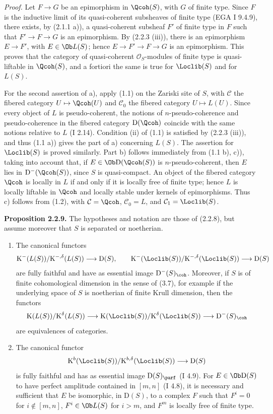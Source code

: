 \emph{Proof.} Let $F\to G$ be an epimorphism in $\Qcoh(S)$, with $G$ of finite type. Since $F$ is the inductive limit of its quasi-coherent subsheaves of finite type (EGA I 9.4.9), there exists, by (2.1.1 a)), a quasi-coherent subsheaf $F'$ of finite type in $F$ such that $F'\to F\to G$ is an epimorphism. By (2.2.3 (iii)), there is an epimorphism $E\to F'$, with $E\in\Ob L(S)$; hence $E\to F'\to F\to G$ is an epimorphism. This proves that the category of quasi-coherent $\mathcal O_S$-modules of finite type is quasi-liftable in $\Qcoh(S)$, and a fortiori the same is true for $\Loclib(S)$ and for $L(S)$.

For the second assertion of a), apply (1.1) on the Zariski site of $S$, with $\mathcal C$ the fibered category $U\mapsto\Qcoh(U)$ and $\mathcal C_0$ the fibered category $U\mapsto L(U)$. Since every object of $L$ is pseudo-coherent, the notions of $n$-pseudo-coherence and pseudo-coherence in the fibered category $\mathrm D(\Qcoh)$ coincide with the same notions relative to $L$ (I 2.14). Condition (ii) of (1.1) is satisfied by (2.2.3 (iii)), and thus (1.1 a)) gives the part of a) concerning $L(S)$. The assertion for $\Loclib(S)$ is proved similarly. Part b) follows immediately from (1.1 b), c)), taking into account that, if $E\in\Ob\mathrm D(\Qcoh(S))$ is $n$-pseudo-coherent, then $E$ lies in $\mathrm D^{-}(\Qcoh(S))$, since $S$ is quasi-compact. An object of the fibered category $\Qcoh$ is locally in $L$ if and only if it is locally free of finite type; hence $L$ is locally liftable in $\Qcoh$ and locally stable under kernels of epimorphisms. Thus c) follows from (1.2), with $\mathcal C=\Qcoh$, $\mathcal C_0=L$, and $\mathcal C_1=\Loclib(S)$.

\textbf{Proposition 2.2.9.} The hypotheses and notation are those of (2.2.8), but assume moreover that $S$ is separated or noetherian.
\begin{enumerate}[label=\alph*)]
\item The canonical functors
\[
\mathrm K^{-}(L(S))/\mathrm K^{-,\delta}(L(S))\longrightarrow \mathrm D(S),
\qquad
\mathrm K^{-}(\Loclib(S))/\mathrm K^{-,\delta}(\Loclib(S))\longrightarrow \mathrm D(S)
\]
are fully faithful and have as essential image $\mathrm D^{-}(S)_{\coh}$. Moreover, if $S$ is of finite cohomological dimension in the sense of (3.7), for example if the underlying space of $S$ is noetherian of finite Krull dimension, then the functors
\[
\mathrm K(L(S))/\mathrm K^{\delta}(L(S))\longrightarrow
\mathrm K(\Loclib(S))/\mathrm K^{\delta}(\Loclib(S))\longrightarrow
\mathrm D^{-}(S)_{\coh}
\]
are equivalences of categories.
\item The canonical functor
\[
\mathrm K^b(\Loclib(S))/\mathrm K^{b,\delta}(\Loclib(S))\longrightarrow \mathrm D(S)
\]
is fully faithful and has as essential image $\mathrm D(S)_{\parf}$ (I 4.9). For $E\in\Ob\mathrm D(S)$ to have perfect amplitude contained in $[m,n]$ (I 4.8), it is necessary and sufficient that $E$ be isomorphic, in $\mathrm D(S)$, to a complex $F$ such that $F^i=0$ for $i\notin[m,n]$, $F^i\in\Ob L(S)$ for $i>m$, and $F^m$ is locally free of finite type.
\end{enumerate}

